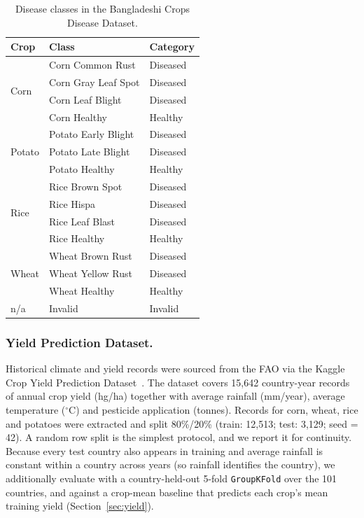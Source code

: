 \begin{table}[!htbp]
\centering
\caption{Disease classes in the Bangladeshi Crops Disease Dataset.}
\label{tab:classes}
\setlength{\tabcolsep}{5pt}
\begin{tabular}{lll}
\toprule
\textbf{Crop} & \textbf{Class} & \textbf{Category}\\
\midrule
\multirow{4}{*}{Corn}   & Corn Common Rust    & Diseased\\
                         & Corn Gray Leaf Spot & Diseased\\
                         & Corn Leaf Blight    & Diseased\\
                         & Corn Healthy        & Healthy\\
\midrule
\multirow{3}{*}{Potato} & Potato Early Blight & Diseased\\
                         & Potato Late Blight  & Diseased\\
                         & Potato Healthy      & Healthy\\
\midrule
\multirow{4}{*}{Rice}   & Rice Brown Spot     & Diseased\\
                         & Rice Hispa          & Diseased\\
                         & Rice Leaf Blast     & Diseased\\
                         & Rice Healthy        & Healthy\\
\midrule
\multirow{3}{*}{Wheat}  & Wheat Brown Rust    & Diseased\\
                         & Wheat Yellow Rust   & Diseased\\
                         & Wheat Healthy       & Healthy\\
\midrule
n/a                      & Invalid             & Invalid\\
\bottomrule
\end{tabular}
\end{table}

\subsubsection{Yield Prediction Dataset.}
Historical climate and yield records were sourced from the FAO via
the Kaggle Crop Yield Prediction
Dataset~\cite{kaggle_yield}.
The dataset covers 15,642 country-year records of annual crop yield
(hg/ha) together with average rainfall (mm/year), average temperature
($^\circ$C) and pesticide application (tonnes).
Records for corn, wheat, rice and potatoes were extracted and split
80\%/20\% (train: 12,513; test: 3,129; seed = 42).
A random row split is the simplest protocol, and we report it for continuity. Because
every test country also appears in training and average rainfall is
constant within a country across years (so rainfall identifies the
country), we additionally evaluate with a country-held-out 5-fold
\texttt{GroupKFold} over the 101 countries, and against a crop-mean
baseline that predicts each crop's mean training yield
(Section~\ref{sec:yield}).

